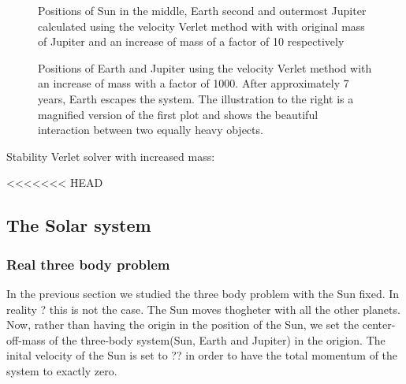 \documentclass[../main.tex]{subfiles}
\begin{document}
\begin{figure}[!h]
  \centering
  \caption{Positions of Sun in the middle, Earth second and outermost Jupiter calculated using the velocity Verlet method with with original mass of Jupiter and an increase of mass of a factor of 10 respectively}
  \label{fig:SunEarthJupiter10}
\end{figure}

\begin{figure}[!h]
  \centering
  \caption{Positions of Earth and Jupiter using the velocity Verlet method with an increase of mass with a factor of 1000. After approximately 7 years, Earth escapes the system. The illustration to the right is a magnified version of the first plot and shows the beautiful interaction between two equally heavy objects.}
  \label{fig:SunEarthJupiter10000}
\end{figure}
\FloatBarrier
Stability Verlet solver with increased mass:



<<<<<<< HEAD
\subsection{The Solar system}
\subsubsection{Real three body problem}

In the previous section we studied the three body problem with the Sun fixed. In reality ? this is not the case. The Sun moves thogheter with all the other planets. Now, rather than having the origin in the position of the Sun, we set the center-off-mass of the three-body system(Sun, Earth and Jupiter) in the origion. The inital velocity of the Sun is set to ?? in order to have the total momentum of the system to exactly zero.
\end{document}
